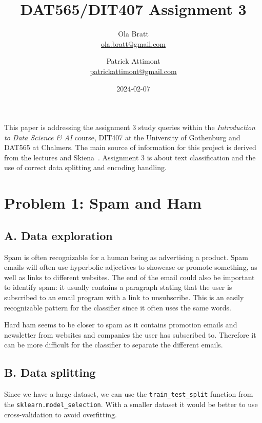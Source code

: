 \documentclass[a4paper]{article}
\begin{document}
\author{Ola Bratt \\
  \href{mailto:ola.bratt@gmail.com}{ola.bratt@gmail.com}
  \and
  Patrick Attimont \\
  \href{patrickattimont@gmail.com}{patrickattimont@gmail.com}
}

\title{DAT565/DIT407 Assignment 3}
\date{2024-02-07}

\maketitle

This paper is addressing the assignment 3 study queries within the \emph{Introduction to Data Science \& AI} course, DIT407 at 
the University of Gothenburg and DAT565 at Chalmers. The main source of information for this project
is derived from the lectures and Skiena~\cite{Skiena:2024}. Assignment 3 is about text classification and the 
use of correct data splitting and encoding handling.

\section*{Problem 1: Spam and Ham}

\subsection*{A. Data exploration}
Spam is often recognizable for a human being as advertising a product.
Spam emails will often use hyperbolic adjectives to showcase or promote something, as well as links to different websites.
The end of the email could also be important to identify spam: it usually contains a paragraph stating that the user is subscribed to an email program with a link to unsubscribe.
This is an easily recognizable pattern for the classifier since it often uses the same words.

Hard ham seems to be closer to spam as it contains promotion emails and newsletter from websites and companies the user has subscribed to.
Therefore it can be more difficult for the classifier to separate the different emails.

\subsection*{B. Data splitting}
Since we have a large dataset, we can use the \texttt{train\_test\_split} function from the \texttt{sklearn.model\_selection}. With a smaller
dataset it would be better to use cross-validation to avoid overfitting.
\end{document}
